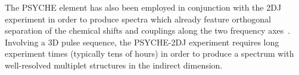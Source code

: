 The \ac{PSYCHE} element has also been employed in conjunction with the \ac{2DJ}
experiment in order to produce spectra which already feature orthogonal
separation of the chemical shifts and couplings along the two frequency
axes~\cite{Foroozandeh2015,Kiraly2017}. Involving a \ac{3D} pulse sequence, the
\ac{PSYCHE}-\ac{2DJ} experiment requires long experiment times (typically tens
of hours) in order to produce a spectrum with well-resolved multiplet
structures in the indirect dimension.
